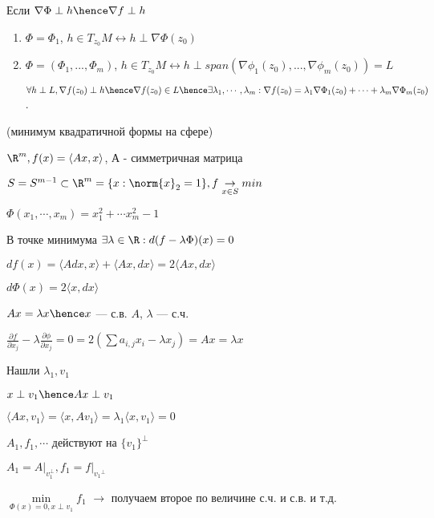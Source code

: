 Если $\nabla \Phi \perp h \hence \nabla f \perp h$

\begin{enumerate}
    \item $\Phi = \Phi_1$, $h \in T_{z_0} M \leftrightarrow h \perp \nabla \Phi(z_0)$
    \item $\Phi = (\Phi_1, ..., \Phi_m)$, $h \in T_{z_0}M \leftrightarrow h \perp span(\nabla \phi_1(z_0), ..., \nabla \phi_m(z_0)) = L$
    
    $\forall h \perp L, \nabla f(z_0) \perp h \hence \nabla f (z_0) \in L \hence \exists \lambda_1, \cdots, \lambda_m : \nabla f(z_0) = \lambda_1 \nabla \Phi_1(z_0) + \cdots + \lambda_m \nabla \Phi_m(z_0)$.
\end{enumerate}

\begin{example}
    (минимум квадратичной формы на сфере)

    $\R ^ m, f(x) = \langle Ax, x \rangle$, А - симметричная матрица

    $S = S ^ {m - 1} \subset \R ^ m = \{ x : \norm{x}_2 = 1 \}, f \underset{x \in S}{\to}min$

    $\Phi(x_1, \cdots, x_m) = x_1 ^ 2 + \cdots x_m ^ 2 - 1 $

    В точке минимума $\exists \lambda \in \R : d(f - \lambda \Phi)(x) = 0$

    $df(x) = \langle A dx, x \rangle + \langle Ax, dx \rangle = 2 \langle Ax, dx \rangle$

    $d\Phi (x) = 2 \langle x, dx \rangle$

    $Ax = \lambda x \hence x $ --- с.в. $A$, $\lambda$ --- с.ч.

    $\frac{\partial f}{\partial x_j} - \lambda \frac{\partial \phi}{\partial x_j} = 0 = 2 (\sum a_{i,j}x_i - \lambda x_j) = Ax = \lambda x$

    Нашли $\lambda_1, v_1$
    
    $x \perp v_1 \hence Ax \perp v_1$

    $\langle Ax, v_1 \rangle = \langle x, A v_1 \rangle = \lambda_1 \langle x, v_1 \rangle = 0$

    $A_1, f_1, \cdots$ действуют на $\{ v_1 \} ^ {\perp}$
    
    $A_1 = A \bigg |_{v_1 ^ \perp }, f_1 = f \bigg | _{{v_1}^{\perp}}$

    $\min \limits_{\Phi(x) = 0, x \perp v_1} f_1$ $\longrightarrow$ получаем второе по величине с.ч. и с.в. и т.д.
\end{example}


